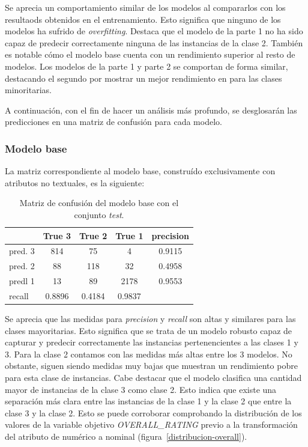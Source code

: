\documentclass[es]{uc3mreport}
\begin{document}
\begin{report}
Se aprecia un comportamiento similar de los modelos al compararlos con los
resultaods obtenidos en el entrenamiento. Esto significa que ninguno de los
modelos ha sufrido de \textit{overfitting}. Destaca que el modelo de la parte 1
no ha sido capaz de predecir correctamente ninguna de las instancias de la clase
2. También es notable cómo el modelo base cuenta con un rendimiento superior al
resto de modelos. Los modelos de la parte 1 y parte 2 se comportan de forma
similar, destacando el segundo por mostrar un mejor rendimiento en para las
clases minoritarias.

A continuación, con el fin de hacer un análisis más profundo, se desglosarán las
predicciones en una matriz de confusión para cada modelo.

\subsubsection{Modelo base}
\label{eva-modelobase}
La matriz correspondiente al modelo base, construído exclusivamente con
atributos no textuales, es la siguiente:

\begin{table}[H]
\center
\begin{tabular}{@{}lccc|c@{}}
    \toprule
             & True 3 & True 2 & True 1 & precision\\
    \hline
    pred. 3  & 814   & 75      & 4      & 0.9115   \\
    pred. 2  & 88    & 118     & 32     & 0.4958   \\
    predl 1  & 13    & 89      & 2178   & 0.9553   \\
    \hline
    recall   & 0.8896 & 0.4184 & 0.9837 &          \\
    \bottomrule
\end{tabular}
\caption{Matriz de confusión del modelo base con el conjunto \textit{test}.}
\end{table}

Se aprecia que las medidas para \textit{precision} y \textit{recall} son altas y
similares para las clases mayoritarias. Esto significa que se trata de un modelo robusto capaz de capturar
y predecir correctamente las instancias pertenencientes a las clases 1 y 3. Para
la clase 2 contamos con las medidas más altas entre los 3 modelos. No obstante,
siguen siendo medidas muy bajas que muestran un rendimiento pobre para esta
clase de instancias. Cabe destacar que el modelo clasifica una cantidad mayor de
instancias de la clase 3 como clase 2. Esto indica que existe una separación más
clara entre las instancias de la clase 1 y la clase 2 que entre la clase 3 y la
clase 2. Esto se puede corroborar comprobando la distribución de los valores de la variable
objetivo \textit{OVERALL\_RATING} previo a la transformación del atributo de
numérico a nominal (figura~\ref{distribucion-overall}).


\end{report}
\end{document}
